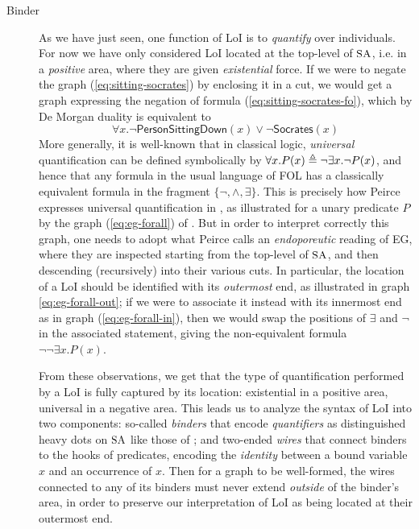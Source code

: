 \begin{description}
  \item[Binder] As we have just seen, one function of LoI is to \emph{quantify}
  over individuals. For now we have only considered LoI located at the top-level
  of $\small\textsc{SA}$, i.e. in a \emph{positive} area, where they are given
  \emph{existential} force. If we were to negate the graph
  (\ref{eq:sitting-socrates}) by enclosing it in a cut, we would get a graph
  expressing the negation of formula (\ref{eq:sitting-socrates-fo}), which by De
  Morgan duality is equivalent to
  $$\forall x. \neg \mathsf{PersonSittingDown}(x) \vee \neg
  \mathsf{Socrates}(x)$$
  More generally, it is well-known that in classical logic, \emph{universal}
  quantification can be defined symbolically by $\forall x. P(x) \triangleq \neg
  \exists x. \neg P(x)$, and hence that any formula in the usual language of FOL
  has a classically equivalent formula in the fragment $\{\neg, \land,
  \exists\}$. This is precisely how Peirce expresses universal quantification in
  , as illustrated for a unary predicate $P$ by the graph
  (\ref{eq:eg-forall}) of . But in order to interpret
  correctly this graph, one needs to adopt what Peirce calls an
  \emph{endoporeutic} reading of EG, where they are inspected starting from the top-level
  of $\small\textsc{SA}$, and then descending (recursively) into their various cuts. In
  particular, the location of a LoI should be identified with its
  \emph{outermost} end, as illustrated in graph \ref{eq:eg-forall-out}; if we
  were to associate it instead with its innermost end as in graph
  (\ref{eq:eg-forall-in}), then we would swap the positions of $\exists$ and
  $\neg$ in the associated statement, giving the non-equivalent formula $\neg
  \neg \exists x. P(x)$.

  From these observations, we get that the type of quantification performed by a
  LoI is fully captured by its location: existential in a positive area,
  universal in a negative area. This leads us to analyze the syntax of LoI into
  two components: so-called \emph{binders} that encode \emph{quantifiers} as
  distinguished heavy dots on $\small\textsc{SA}$ like those of
  ; and two-ended \emph{wires} that connect binders to the hooks of
  predicates, encoding the \emph{identity} between a bound variable $x$ and an
  occurrence of $x$. Then for a graph to be well-formed, the wires connected to
  any of its binders must never extend \emph{outside} of the binder's area, in
  order to preserve our interpretation of LoI as being located at their
  outermost end.
  

\end{description}
